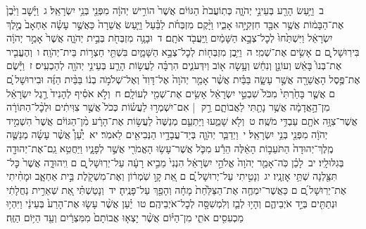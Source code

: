 \documentclass[18pt]{article}
\newcommand{\vart}[1]{\Bfootnote{#1}}	%
\newcommand{\kri}[1]{\Afootnote{#1}}	%
\begin{document}
 {\loc ב~}וַיַּ֥עַשׂ הָרַ֖ע בְּעֵינֵ֣י יְהֹוָ֑ה כְּתֽוֹעֲבֹת֙ הַגּוֹיִ֔ם אֲשֶׁר֙ הוֹרִ֣ישׁ יְהֹוָ֔ה מִפְּנֵ֖י בְּנֵ֥י יִשְׂרָאֵֽל׃ \startlock
 {\loc ג~}וַיָּ֗שׇׁב וַיִּ֙בֶן֙ אֶת־הַבָּמ֔וֹת אֲשֶׁ֥ר אִבַּ֖ד חִזְקִיָּ֣הוּ אָבִ֑יו וַיָּ֨קֶם מִזְבְּחֹ֜ת לַבַּ֗עַל וַיַּ֤עַשׂ אֲשֵׁרָה֙ כַּאֲשֶׁ֣ר עָשָׂ֗ה אַחְאָב֙ מֶ֣לֶךְ יִשְׂרָאֵ֔ל וַיִּשְׁתַּ֙חוּ֙ לְכׇל־צְבָ֣א הַשָּׁמַ֔יִם וַֽיַּעֲבֹ֖ד אֹתָֽם׃ \startlock
 {\loc ד~}וּבָנָ֥ה מִזְבְּחֹ֖ת בְּבֵ֣ית יְהֹוָ֑ה אֲשֶׁר֙ אָמַ֣ר יְהֹוָ֔ה בִּירֽוּשָׁל ַ֖͏ְם ם אָשִׂ֥ים אֶת־שְׁמִֽי׃ \startlock
 {\loc ה~}וַיִּ֥בֶן מִזְבְּח֖וֹת לְכׇל־צְבָ֣א הַשָּׁמָ֑יִם בִּשְׁתֵּ֖י חַצְר֥וֹת בֵּית־יְהֹוָֽה׃ \startlock
 {\loc ו~}וְהֶעֱבִ֤יר אֶת־בְּנוֹ֙ בָּאֵ֔שׁ וְעוֹנֵ֣ן וְנִחֵ֔שׁ וְעָ֥שָׂה א֖וֹב וְיִדְּעֹנִ֑ים הִרְבָּ֗ה לַעֲשׂ֥וֹת הָרַ֛ע בְּעֵינֵ֥י יְהֹוָ֖ה לְהַכְעִֽיס׃ \startlock
 {\loc ז~}וַיָּ֕שֶׂם אֶת־פֶּ֥סֶל הָאֲשֵׁרָ֖ה אֲשֶׁ֣ר עָשָׂ֑ה בַּבַּ֗יִת אֲשֶׁ֨ר אָמַ֤ר יְהֹוָה֙ אֶל־דָּוִד֙ וְאֶל־שְׁלֹמֹ֣ה בְנ֔וֹ בַּבַּ֨יִת הַזֶּ֜ה וּבִירוּשָׁל ַ֗͏ְם ם אֲשֶׁ֤ר בָּחַ֙רְתִּי֙ מִכֹּל֙ שִׁבְטֵ֣י יִשְׂרָאֵ֔ל אָשִׂ֥ים אֶת־שְׁמִ֖י לְעוֹלָֽם׃ \startlock
 {\loc ח~}וְלֹ֣א אֹסִ֗יף לְהָנִיד֙ רֶ֣גֶל יִשְׂרָאֵ֔ל מִן־הָ֣אֲדָמָ֔ה אֲשֶׁ֥ר נָתַ֖תִּי לַאֲבוֹתָ֑ם רַ֣ק  |  אִם־יִשְׁמְר֣וּ לַעֲשׂ֗וֹת כְּכֹל֙ אֲשֶׁ֣ר צִוִּיתִ֔ים וּלְכׇ֨ל־הַתּוֹרָ֔ה אֲשֶׁר־צִוָּ֥ה אֹתָ֖ם עַבְדִּ֥י מֹשֶֽׁה׃ \startlock
 {\loc ט~}וְלֹ֖א שָׁמֵ֑עוּ וַיַּתְעֵ֤ם מְנַשֶּׁה֙ לַעֲשׂ֣וֹת אֶת־הָרָ֔ע מִ֨ן־הַגּוֹיִ֔ם אֲשֶׁר֙ הִשְׁמִ֣יד יְהֹוָ֔ה מִפְּנֵ֖י בְּנֵ֥י יִשְׂרָאֵֽל׃ \startlock
 {\loc י~}וַיְדַבֵּ֧ר יְהֹוָ֛ה בְּיַד־עֲבָדָ֥יו הַנְּבִיאִ֖ים לֵאמֹֽר׃ \startlock
 {\loc יא~}יַ֩עַן֩ אֲשֶׁ֨ר עָשָׂ֜ה מְנַשֶּׁ֤ה מֶֽלֶךְ־יְהוּדָה֙ הַתֹּעֵב֣וֹת הָאֵ֔לֶּה הֵרַ֕ע מִכֹּ֛ל אֲשֶׁר־עָשׂ֥וּ הָאֱמֹרִ֖י אֲשֶׁ֣ר לְפָנָ֑יו וַיַּחֲטִ֥א גַֽם־אֶת־יְהוּדָ֖ה בְּגִלּוּלָֽיו׃ \startlock
 {\loc יב~}לָכֵ֗ן כֹּֽה־אָמַ֤ר יְהֹוָה֙ אֱלֹהֵ֣י יִשְׂרָאֵ֔ל הִנְנִי֙ מֵבִ֣יא רָעָ֔ה עַל־יְרֽוּשָׁל ַ֖͏ְם ם וִֽיהוּדָ֑ה אֲשֶׁר֙ כׇּל־ \edtext{\edtext{(שמעיו)}{\kri{קרי: שֹׁ֣מְעָ֔הּ}}}{\vart{א-כתיב=שֹׁ֣מְעָ֔יו | }}  תִּצַּ֖לְנָה שְׁתֵּ֥י אׇזְנָֽיו׃ \startlock
 {\loc יג~}וְנָטִ֣יתִי עַל־יְרוּשָׁל ַ֗͏ְם ם אֵ֚ת קָ֣ו שֹֽׁמְר֔וֹן וְאֶת־מִשְׁקֹ֖לֶת בֵּ֣ית אַחְאָ֑ב וּמָחִ֨יתִי אֶת־יְרֽוּשָׁל ַ֜͏ְם ם כַּאֲשֶׁר־יִמְחֶ֤ה אֶת־הַצַּלַּ֙חַת֙ מָחָ֔ה וְהָפַ֖ךְ עַל־פָּנֶֽיהָ׃ \startlock
 {\loc יד~}וְנָטַשְׁתִּ֗י אֵ֚ת שְׁאֵרִ֣ית נַחֲלָתִ֔י וּנְתַתִּ֖ים בְּיַ֣ד אֹיְבֵיהֶ֑ם וְהָי֥וּ לְבַ֛ז וְלִמְשִׁסָּ֖ה לְכׇל־אֹיְבֵיהֶֽם׃ \startlock
 {\loc טו~}יַ֗עַן אֲשֶׁ֨ר עָשׂ֤וּ אֶת־הָרַע֙ בְּעֵינַ֔י וַיִּהְי֥וּ מַכְעִסִ֖ים אֹתִ֑י מִן־הַיּ֗וֹם אֲשֶׁ֨ר יָצְא֤וּ אֲבוֹתָם֙ מִמִּצְרַ֔יִם וְעַ֖ד הַיּ֥וֹם הַזֶּֽה׃ \startlock
\end{document}
